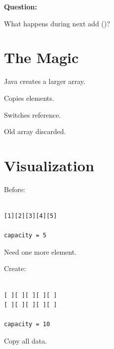 \documentclass[11pt,a4paper]{book}
\begin{document}
\textbf{\textbf{Question:}}


What happens during next add ()?


\section{The Magic}

Java creates a larger array.


Copies elements.


Switches reference.


Old array discarded.


\section{Visualization}

Before:

\begin{verbatim}

[1][2][3][4][5]

capacity = 5

\end{verbatim}


Need one more element.


Create:

\begin{verbatim}

[ ][ ][ ][ ][ ]
[ ][ ][ ][ ][ ]

capacity = 10

\end{verbatim}


Copy all data.

\end{document}

